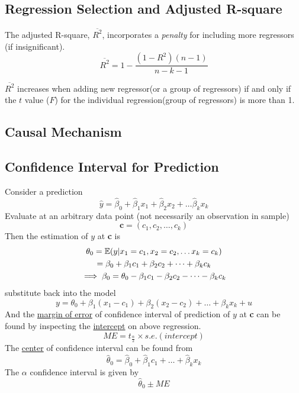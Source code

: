 \documentclass[]{article}
\begin{document}
    	\subsection{Regression Selection and Adjusted R-square}
    		\par The adjusted R-square, $\overline{R^2}$, incorporates a \emph{penalty} for including more regressors (if insignificant).
    		\[
    			\overline{R^2} = 1 - \frac{(1-R^2)(n-1)}{n-k-1}
    		\]
    		\begin{remark}
    			$\overline{R^2}$ increases when adding new regressor(or a group of regressors) if and only if the $t$ value ($F$) for the individual regression(group of regressors) is more than 1.
    		\end{remark}
    	
    	\subsection{Causal Mechanism}
    	
    	\subsection{Confidence Interval for Prediction}
    		\par Consider a prediction 
    		\[
    			\hat{y} = \hat{\beta}_0 + \hat{\beta}_1 x_1 + \hat{\beta}_2 x_2 + \dots \hat{\beta}_k x_k
    		\]
    		Evaluate at an arbitrary data point (not necessarily an observation in sample)
    		\[
    			\textbf{c} = (c_1, c_2, \dots ,c_k)
    		\]
    		Then the estimation of $y$ at \textbf{c} is 
    		\begin{gather*}
    			\theta_0 = \mathbb{E}({y|x_1=c_1, x_2=c_2, \dots x_k=c_k}) \\
    			= \beta_0 + \beta_1 c_1 + \beta_2 c_2 + \dots + \beta_k c_k \\
    			\implies \beta_0 = \theta_0 - \beta_1 c_1 - \beta_2 c_2 - \dots - \beta_k c_k
    		\end{gather*}
    		substitute back into the model
    		\[
    			y = \theta_0 + \beta_1 (x_1 - c_1) + \beta_2 (x_2 - c_2) + \dots + \beta_k x_k + u
    		\]
    		And the \ul{margin of error} of confidence interval of prediction of $y$ at \textbf{c} can be found by inspecting the \ul{intercept} on above regression.
    		\[
    			ME = t_{\frac{\alpha}{2}} \times s.e. (intercept)
    		\]
      		The \ul{center} of confidence interval can be found from 
    		\[
    			\hat{\theta}_0 = \hat{\beta}_0 + \hat{\beta}_1 c_1 + \dots + \hat{\beta}_k x_k
      		\]
      		The $\alpha$ confidence interval is given by
      		\[
      			\hat{\theta}_0 \pm ME
      		\]
      		
\end{document}
